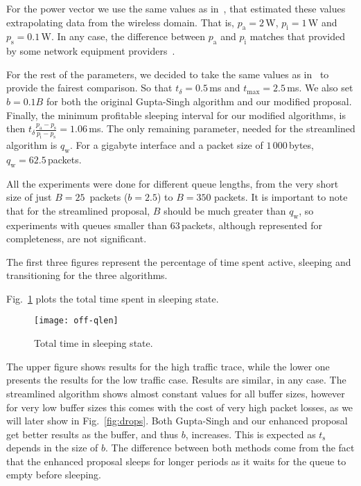 \documentclass[conference,english]{IEEEtran}
\begin{document}
For the power vector we use the same values as
in~\cite{gupta04:_feasib_study_for_power_manag}, that estimated these values
extrapolating data from the wireless domain. That is, $p_\mathrm a=2\,$W,
$p_\mathrm i=1\,$W and $p_\mathrm s=0.1\,$W. In any case, the difference
between $p_\mathrm a$ and $p_\mathrm i$ matches that provided by some network
equipment providers~\cite{08:_nortely}.

For the rest of the parameters, we decided to take the same values as
in~\cite{gupta07:_using_low_power_modes_for} to provide the fairest
comparison. So that $t_\delta=0.5\,$ms and $t_{\max} = 2.5\,$ms. 
We also set $b=0.1B$ for both the original Gupta-Singh algorithm and our
modified proposal.
Finally, the
minimum profitable sleeping interval for our modified algorithms, is then
$t_\delta\frac{p_\mathrm a - p_\mathrm s}{p_\mathrm i-p_\mathrm s} =
1.06\,$ms. The only remaining parameter, needed for the streamlined algorithm
is $q_\mathrm w$. For a gigabyte interface and a packet size of
$1\,000\,$bytes, $q_\mathrm w = 62.5\,$packets.

All the experiments were done for different queue lengths, from the very short
size of just $B=25\,$ packets ($b=2.5$) to $B=350$ packets. It is important to
note that for the streamlined proposal, $B$ should be much greater than
$q_\mathrm w$, so experiments with queues smaller than $63\,$packets, although
represented for completeness, are not significant.

The first three figures represent the percentage of time spent active,
sleeping and transitioning for the three algorithms.

Fig.~\ref{fig:off-time} plots the total time spent in sleeping state.
\begin{figure}
  \centering
  \texttt{[image: off-qlen]}
  \caption{Total time in sleeping state.}
  \label{fig:off-time}
\end{figure}
The upper figure shows results for the high traffic trace, while the lower one
presents the results for the low traffic case. Results are similar, in any
case. The streamlined algorithm shows almost constant values for all buffer
sizes, however for very low buffer sizes this comes with the cost of very high
packet losses, as we will later show in Fig.~\ref{fig:drops}. Both Gupta-Singh
and our enhanced proposal get better results as the buffer, and thus $b$,
increases. This is expected as $t_\mathrm s$ depends in the size of $b$. The
difference between both methods come from the fact that the enhanced proposal
sleeps for longer periods as it waits for the queue to empty before sleeping.
\end{document}
